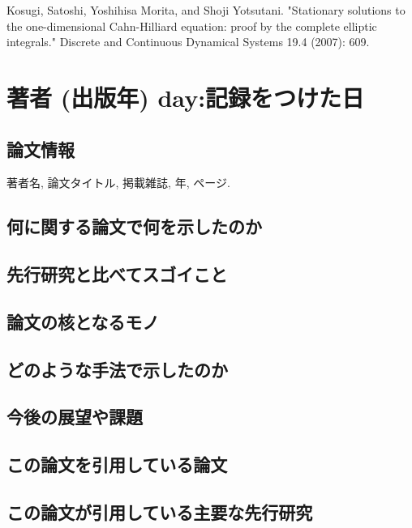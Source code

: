 \documentclass[openary, a4paper, oneside]{jsarticle}
\begin{document}
\newpage

\begin{thebibliography}{99}
	Kosugi, Satoshi, Yoshihisa Morita, and Shoji Yotsutani. "Stationary solutions to the one-dimensional Cahn-Hilliard equation: proof by the complete elliptic integrals." Discrete and Continuous Dynamical Systems 19.4 (2007): 609.
\end{thebibliography}

\appendix

\section{著者 (出版年) day:記録をつけた日}
	\subsection{論文情報}
		著者名, 論文タイトル, 掲載雑誌, 年, ページ.

	\subsection{何に関する論文で何を示したのか}

	\subsection{先行研究と比べてスゴイこと}

	\subsection{論文の核となるモノ}

	\subsection{どのような手法で示したのか}

	\subsection{今後の展望や課題}

	\subsection{この論文を引用している論文}

	\subsection{この論文が引用している主要な先行研究}
\end{document}
